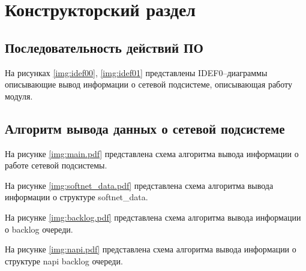 \chapter{Конструкторский раздел}

\section{Последовательность действий ПО}

На рисунках \ref{img:idef00}, \ref{img:idef01} представлены IDEF0--диаграммы описывающие вывод информации о сетевой подсистеме, описывающая работу модуля.

\FloatBarrier

\FloatBarrier

\section{Алгоритм вывода данных о сетевой подсистеме}

На рисунке \ref{img:main.pdf} представлена схема алгоритма вывода информации о работе сетевой подсистемы.

\FloatBarrier

На рисунке \ref{img:softnet_data.pdf} представлена схема алгоритма вывода информации о структуре softnet\_data.

\FloatBarrier

На рисунке \ref{img:backlog.pdf} представлена схема алгоритма вывода информации о backlog очереди.

\FloatBarrier

На рисунке \ref{img:napi.pdf} представлена схема алгоритма вывода информации о структуре napi backlog очереди.

